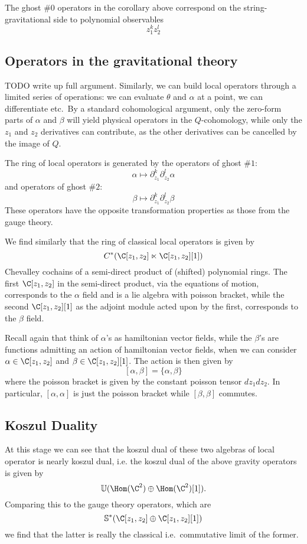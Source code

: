 \documentclass[12pt]{amsart}
\begin{document}
\begin{rmk}
  The ghost \#$0$ operators in the corollary above correspond on the string-gravitational side to polynomial observables
  $$z_1^kz_2^l$$
\end{rmk}

\subsection{Operators in the gravitational theory}
TODO write up full argument.
Similarly, we can build local operators through a limited series of operations:
we can evaluate $\theta$ and $\alpha$ at a point, we can differentiate etc.\ By
a standard cohomological argument, only the zero-form parts of $\alpha$ and
$\beta$ will yield physical operators in the $Q$-cohomology, while only the
$z_1$ and $z_2$ derivatives can contribute, as the other derivatives can be
cancelled by the image of $Q$.\par

The ring of local operators is generated by the operators of ghost \#$1$: $$\alpha \mapsto
\partial_{z_1}^k \partial_{z_2}^l \alpha$$
and operators of ghost \#$2$:
$$\beta \mapsto \partial_{z_1}^k \partial_{z_2}^l \beta$$
These operators have the opposite transformation properties as those from the
gauge theory.\par

We find similarly that the ring of classical local operators is given by
$$C^*(\C[z_1,z_2] \ltimes \C[z_1,z_2][1])$$
Chevalley cochains of a semi-direct product of (shifted) polynomial rings. The
first $\C[z_1,z_2]$ in the semi-direct product, via the equations of motion,
corresponds to the $\alpha$ field and is a lie algebra with poisson bracket,
while the second $\C[z_1,z_2][1]$ as the adjoint module acted upon by the
first, corresponds to the $\beta$ field.

\begin{rmk}
  Recall again that think of $\alpha$'s as
  hamiltonian vector fields, while the $\beta$'s are functions admitting an action
  of hamiltonian vector fields, when  we can consider $\alpha \in \C[z_1,z_2]$ and $\beta \in
  \C[z_1,z_2][1]$.
  The action is then given by
  $$[\alpha, \beta] = \{\alpha,\beta\}$$ where the poisson bracket is given by
  the constant poisson tensor $dz_1dz_2$. In particular, $[\alpha,\alpha]$ is
  just the poisson bracket while $[\beta,\beta]$ commutes.
\end{rmk}

\subsection{Koszul Duality}
  At this stage we can see that the koszul dual of these two algebras of local
  operator is nearly koszul dual, i.e. the koszul dual of the above gravity
  operators is given by $$\mbf{U}(\Hom(\C^2)\oplus\Hom(\C^2)[1]).$$
  Comparing this to the gauge theory operators, which are
  $$\mbf{S}^*(\C[z_1,z_2]\oplus\C[z_1,z_2][1])$$ we find that the latter is
  really the classical i.e.\ commutative limit of the former.
\end{document}
